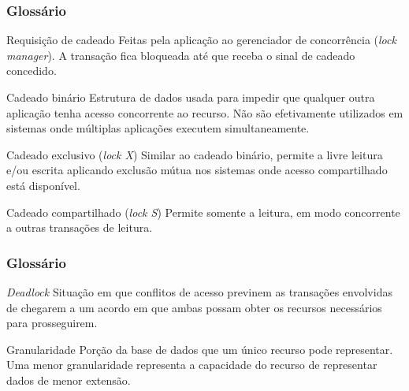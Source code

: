 \documentclass{beamer}
\begin{document}

\begin{frame}
    \frametitle{Glossário}

    \begin{block}{Requisição de cadeado}
        Feitas pela aplicação ao gerenciador de concorrência (\emph{lock manager}). A transação fica bloqueada até que receba o sinal de cadeado concedido.
    \end{block}
    \begin{block}{Cadeado binário}
        Estrutura de dados usada para impedir que qualquer outra aplicação tenha acesso concorrente ao recurso. Não são efetivamente utilizados em sistemas onde múltiplas aplicações executem simultaneamente.
    \end{block}
    \begin{block}{Cadeado exclusivo (\emph{lock X})}
        Similar ao cadeado binário, permite a livre leitura e/ou escrita aplicando exclusão mútua nos sistemas onde acesso compartilhado está disponível.
    \end{block}
    \begin{block}{Cadeado compartilhado (\emph{lock S})}
        Permite somente a leitura, em modo concorrente a outras transações de leitura.
    \end{block}
\end{frame}


\begin{frame}
    \frametitle{Glossário}

    \begin{block}{\emph{Deadlock}}
        Situação em que conflitos de acesso previnem as transações envolvidas de chegarem a um acordo em que ambas possam obter os recursos necessários para prosseguirem.
    \end{block}
    \begin{block}{Granularidade}
        Porção da base de dados que um único recurso pode representar. Uma menor granularidade representa a capacidade do recurso de representar dados de menor extensão.
    \end{block}
\end{frame}
\end{document}

